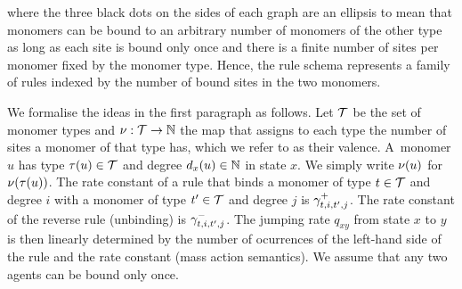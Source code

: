 \begin{center}
\end{center}
where the three black dots on the sides of each graph
are an ellipsis to mean that monomers can be bound
to an arbitrary number of monomers of the other type
as long as each site is bound only once
and there is a finite number of sites per monomer
fixed by the monomer type.
Hence, the rule schema %
represents a family of rules indexed by %
the number of bound sites in the two monomers.

We formalise the ideas in the first paragraph as follows.
Let $\mathcal{T}$ be the set of monomer types %
and $\nu: \mathcal{T} \to \mathbb{N}$ the map that assigns
to each type the number of sites a monomer of that type has,
which we refer to as their valence.
A~monomer $u$ has type $\tau(u) \in \mathcal{T}$
and degree $d_x(u) \in \mathbb{N}$ in state $x$.
We simply write $\nu(u)$ for $\nu(\tau(u))$.
The rate constant of a rule that binds
a monomer of type $t \in \mathcal{T}$ and degree $i$ with
a monomer of type $t' \in \mathcal{T}$ and degree $j$
is $\gamma^+_{t,i,t',j}$.
The rate constant of the reverse rule (unbinding)
is $\gamma^-_{t,i,t',j}$.
%
The jumping rate $q_{xy}$ from state $x$ to $y$
is then linearly determined by the number of ocurrences
of the left-hand side of the rule and the rate constant
(mass action semantics).
We assume that any two agents can be bound only once.

